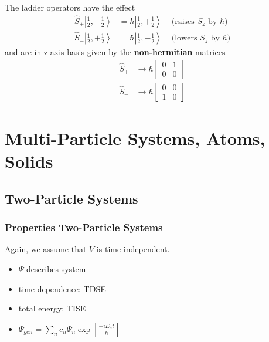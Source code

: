 The ladder operators have the effect
\begin{align*}
    \widehat{S}_{+}\left|\frac{1}{2},-\frac{1}{2}\right> & =\hbar\left|\frac{1}{2},+\frac{1}{2}\right> & \text{ (raises $S_z$ by $\hbar$)} \\
    \widehat{S}_{-}\left|\frac{1}{2},+\frac{1}{2}\right> & =\hbar\left|\frac{1}{2},-\frac{1}{2}\right> & \text{ (lowers $S_z$ by $\hbar$)}
\end{align*}
and are in z-axis basis given by the \textbf{non-hermitian} matrices
\begin{align*}
    \widehat{S}_{+} & \rightarrow \hbar\begin{bmatrix}
                                           0 & 1 \\
                                           0 & 0
                                       \end{bmatrix} \\
    \widehat{S}_{-} & \rightarrow \hbar\begin{bmatrix}
                                           0 & 0 \\
                                           1 & 0
                                       \end{bmatrix}
\end{align*}

\section{Multi-Particle Systems, Atoms, Solids}
\subsection{Two-Particle Systems}
\subsubsection{Properties Two-Particle Systems}
Again, we assume that $V$ is time-independent.

\newpar{}

\begin{itemize}
    \item $\Psi$ describes system
    \item time dependence: TDSE
    \item total energy: TISE
    \item $\Psi_{gen}=\sum_{n} c_{n} \Psi_{n} \exp\left[\frac{-i E_{n} t}{\hbar}\right]$
\end{itemize}

